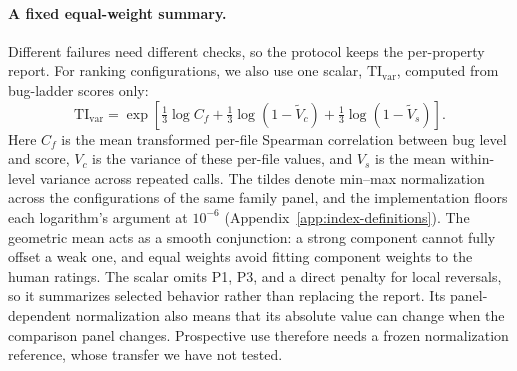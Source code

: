 \paragraph{A fixed equal-weight summary.}
Different failures need different checks, so the protocol keeps the per-property report.
For ranking configurations, we also use one scalar, $\mathrm{TI}_{\mathrm{var}}$, computed from bug-ladder scores only:
\begin{equation}
\mathrm{TI}_{\mathrm{var}}=\exp\!\left[\tfrac13\log C_f+\tfrac13\log(1-\widetilde V_c)+\tfrac13\log(1-\widetilde V_s)\right].
\label{eq:tivar}
\end{equation}
Here $C_f$ is the mean transformed per-file Spearman correlation between bug level and score, $V_c$ is the variance of these per-file values, and $V_s$ is the mean within-level variance across repeated calls.
The tildes denote min--max normalization across the configurations of the same family panel, and the implementation floors each logarithm's argument at $10^{-6}$ (Appendix~\ref{app:index-definitions}).
The geometric mean acts as a smooth conjunction: a strong component cannot fully offset a weak one, and equal weights avoid fitting component weights to the human ratings.
The scalar omits P1, P3, and a direct penalty for local reversals, so it summarizes selected behavior rather than replacing the report.
Its panel-dependent normalization also means that its absolute value can change when the comparison panel changes.
Prospective use therefore needs a frozen normalization reference, whose transfer we have not tested.
